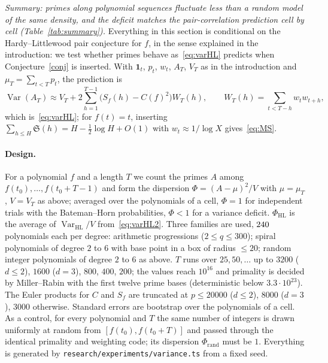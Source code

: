 \documentclass[11pt,a4paper]{article}
\theoremstyle{remark}\newtheorem{remark}[theorem]{Remark}
\newcommand{\Var}{\operatorname{Var}}
\newcommand{\Sig}{\mathfrak S}
\begin{document}
\emph{Summary: primes along polynomial sequences fluctuate less than a random model of the same density,
and the deficit matches the pair-correlation prediction cell by cell (Table~\ref{tab:summary}).}
Everything in this section is conditional on the Hardy--Littlewood pair conjecture for $f$, in the
sense explained in the introduction: we test whether primes behave as~\eqref{eq:varHL} predicts when
Conjecture~\ref{conj} is inserted. With $\mathbf 1_t$, $p_t$, $w_t$, $A_T$, $V_T$ as in the
introduction and $\mu_T=\sum_{t<T}p_t$, the prediction is
\begin{equation}\label{eq:varHL2}
\Var(A_T)\approx V_T+2\sum_{h=1}^{T-1}\bigl(S_f(h)-C(f)^2\bigr)W_T(h),\qquad W_T(h)=\sum_{t<T-h}w_tw_{t+h},
\end{equation}
which is~\eqref{eq:varHL}; for $f(t)=t$, inserting $\sum_{h\le H}\Sig(h)=H-\tfrac12\log H+O(1)$ with
$w_t\approx1/\log X$ gives~\eqref{eq:MS}.

\paragraph{Design.} For a polynomial $f$ and a length $T$ we count the primes $A$ among
$f(t_0),\dots,f(t_0+T-1)$ and form the dispersion $\Phi=(A-\mu)^2/V$ with $\mu=\mu_T$, $V=V_T$ as
above; averaged over the polynomials of a cell, $\Phi=1$ for independent trials with the
Bateman--Horn probabilities, $\Phi<1$ for a variance deficit. $\Phi_{\mathrm{HL}}$ is the average of
$\Var_{\mathrm{HL}}/V$ from~\eqref{eq:varHL2}. Three families are used, $240$ polynomials each per
degree: arithmetic progressions ($2\le q\le300$); spiral polynomials of degree $2$ to $6$ with base
point in a box of radius $\le20$; random integer polynomials of degree $2$ to $6$ as above. $T$ runs
over $25,50,\dots$ up to $3200$ ($d\le2$), $1600$ ($d=3$), $800$, $400$, $200$; the values reach
$10^{16}$ and primality is decided by Miller--Rabin with the first twelve prime bases (deterministic
below $3.3\cdot10^{23}$). The Euler products for $C$ and $S_f$ are truncated at $p\le20000$
($d\le2$), $8000$ ($d=3$), $3000$ otherwise. Standard errors are bootstrap over the polynomials of a
cell. As a control, for every polynomial and $T$ the same number of integers is drawn uniformly at random
from $[f(t_0),f(t_0+T)]$ and passed through the identical primality and weighting code; its dispersion
$\Phi_{\mathrm{rand}}$ must be $1$. Everything is generated by \texttt{research/experiments/variance.ts} from a fixed
seed.
\end{document}
